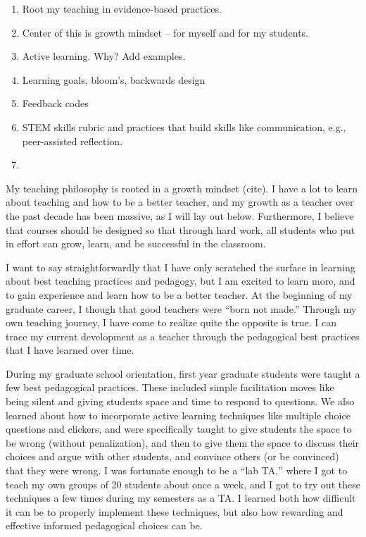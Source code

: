 \documentclass[11pt]{article}
\begin{document}
\thispagestyle{fancy}

\begin{enumerate}
    \item Root my teaching in evidence-based practices.
    \item Center of this is growth mindset -- for myself and for my students.
    \item Active learning. Why? Add examples.
    \item Learning goals, bloom's, backwards design
    \item Feedback codes
    \item STEM skills rubric and practices that build skills like communication, e.g., peer-assisted reflection.
    \item 
\end{enumerate}

My teaching philosophy is rooted in a growth mindset (cite). 
I have a lot to learn about teaching and how to be a better teacher, and my growth as a teacher over the past decade has been massive, as I will lay out below. 
Furthermore, I believe that courses should be designed so that through hard work, all students who put in effort can grow, learn, and be successful in the classroom.

I want to say straightforwardly that I have only scratched the surface in learning about best teaching practices and pedagogy, but I am excited to learn more, and to gain experience and learn how to be a better teacher. 
At the beginning of my graduate career, I though that good teachers were “born not made.” Through my own teaching journey, I have come to realize quite the opposite is true. 
I can trace my current development as a teacher through the pedagogical best practices that I have learned over time.

During my graduate school orientation, first year graduate students were taught a few best pedagogical practices. 
These included  simple facilitation moves like being silent and giving students space and time to respond to questions. 
We also learned about how to  incorporate active learning techniques like multiple choice questions and clickers, and were specifically taught to give students the space to be wrong (without penalization), and then to give them the space to discuss their choices and argue with other students, and convince others (or be convinced) that they were wrong. 
I was fortunate enough to be a “lab TA,” where I got to teach my own groups of 20 students about once a week, and I got to try out these techniques a few times during my semesters as a TA. 
I learned both how difficult it can be to properly implement these techniques, but also how rewarding and effective informed pedagogical choices can be.
\end{document}
